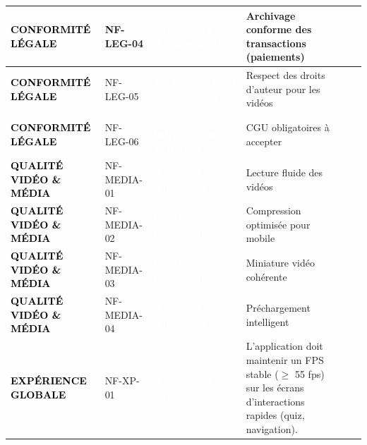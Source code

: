 \begin{longtable}{|P{2.15cm}|P{1.55cm}|P{2.35cm}|P{5.60cm}|P{1.65cm}|P{1.45cm}|}
\textcolor{black}{\textbf{CONFORMITÉ LÉGALE}} & NF-LEG-04 & \textcolor{white}{\textbf{Utilisateurs \& Abonnements}} & Archivage conforme des transactions (paiements) &  &  \\ \hline
{}
\textcolor{black}{\textbf{CONFORMITÉ LÉGALE}} & NF-LEG-05 & \textcolor{white}{\textbf{Tableau de bord Administrateur}} & Respect des droits d’auteur pour les vidéos &  &  \\ \hline
{}
\textcolor{black}{\textbf{CONFORMITÉ LÉGALE}} & NF-LEG-06 & \textcolor{white}{\textbf{Sécurité, Infrastructure \& RGPD}} & CGU obligatoires à accepter &  &  \\ \hline
{}
\textcolor{black}{\textbf{QUALITÉ VIDÉO \& MÉDIA}} & NF-MEDIA-01 & \textcolor{white}{\textbf{Application Apprenant}} & Lecture fluide des vidéos &  &  \\ \hline
{}
\textcolor{black}{\textbf{QUALITÉ VIDÉO \& MÉDIA}} & NF-MEDIA-02 & \textcolor{white}{\textbf{Contenus pédagogiques}} & Compression optimisée pour mobile &  &  \\ \hline
{}
\textcolor{black}{\textbf{QUALITÉ VIDÉO \& MÉDIA}} & NF-MEDIA-03 & \textcolor{white}{\textbf{Contenus pédagogiques}} & Miniature vidéo cohérente &  &  \\ \hline
{}
\textcolor{black}{\textbf{QUALITÉ VIDÉO \& MÉDIA}} & NF-MEDIA-04 & \textcolor{white}{\textbf{Application Apprenant}} & Préchargement intelligent &  &  \\ \hline
{}
\textcolor{black}{\textbf{EXPÉRIENCE GLOBALE}} & NF-XP-01 & \textcolor{white}{\textbf{Application Apprenant}} & L’application doit maintenir un FPS stable (\ensuremath{\geq} 55 fps) sur les écrans d’interactions rapides (quiz, navigation). &  &  \\ \hline

\end{longtable}
